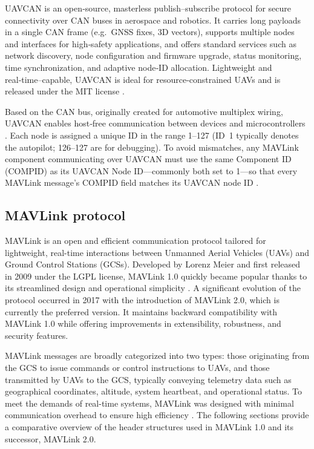 UAVCAN is an open‑source, masterless publish–subscribe protocol for secure connectivity over CAN buses in aerospace and robotics.  It carries long payloads in a single CAN frame (e.g.\ GNSS fixes, 3D vectors), supports multiple nodes and interfaces for high‑safety applications, and offers standard services such as network discovery, node configuration and firmware upgrade, status monitoring, time synchronization, and adaptive node‑ID allocation.  Lightweight and real‑time–capable, UAVCAN is ideal for resource‑constrained UAVs and is released under the MIT license \cite{kriz2015uranuslink}.

\vspace{0.5cm}

Based on the CAN bus, originally created for automotive multiplex wiring, UAVCAN enables host‑free communication between devices and microcontrollers \cite{kriz2015uranuslink}.  Each node is assigned a unique ID in the range 1–127 (ID 1 typically denotes the autopilot; 126–127 are for debugging).  To avoid mismatches, any MAVLink component communicating over UAVCAN must use the same Component ID (COMPID) as its UAVCAN Node ID—commonly both set to 1—so that every MAVLink message’s COMPID field matches its UAVCAN node ID \cite{kriz2015uranuslink}.




\subsection{MAVLink protocol}


MAVLink is an open and efficient communication protocol tailored for lightweight, real-time interactions between Unmanned Aerial Vehicles (UAVs) and Ground Control Stations (GCSs). Developed by Lorenz Meier and first released in 2009 under the LGPL license, MAVLink 1.0 quickly became popular thanks to its streamlined design and operational simplicity \cite{allouch2019mavsec, koubaa2017mavlink}. A significant evolution of the protocol occurred in 2017 with the introduction of MAVLink 2.0, which is currently the preferred version. It maintains backward compatibility with MAVLink 1.0 while offering improvements in extensibility, robustness, and security features.

\vspace{0.5cm}

MAVLink messages are broadly categorized into two types: those originating from the GCS to issue commands or control instructions to UAVs, and those transmitted by UAVs to the GCS, typically conveying telemetry data such as geographical coordinates, altitude, system heartbeat, and operational status. To meet the demands of real-time systems, MAVLink was designed with minimal communication overhead to ensure high efficiency \cite{allouch2019mavsec}. The following sections provide a comparative overview of the header structures used in MAVLink 1.0 and its successor, MAVLink 2.0.



